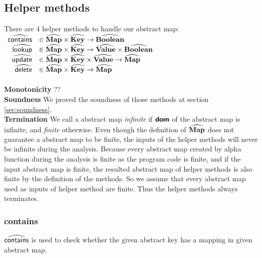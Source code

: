 \subsection{Helper methods}
There are 4 helper methods to handle our abstract map:\\

$\begin{array}{rl}
\widehat{\textsf{contains}} & \in \widehat{\textbf{Map}} \times \widehat{\textbf{Key}} \rightarrow \widehat{\textbf{Boolean}} \\
\widehat{\textsf{lookup}} & \in \widehat{\textbf{Map}} \times \widehat{\textbf{Key}} \rightarrow \widehat{\textbf{Value}} \times \widehat{\textbf{Boolean}} \\
\widehat{\textsf{update}} & \in \widehat{\textbf{Map}} \times \widehat{\textbf{Key}} \times \widehat{\textbf{Value}} \rightarrow \widehat{\textbf{Map}} \\
\widehat{\textsf{delete}} & \in \widehat{\textbf{Map}} \times \widehat{\textbf{Key}} \rightarrow \widehat{\textbf{Map}} \\
\end{array}$\\\\

\textbf{Monotonicity } ??\\

\textbf{Soundness }
We proved the soundness of those methods at section \ref{sec:soundness}.\\

\textbf{Termination }
We call a abstract map \emph{infinite} if $\textsf{\textbf{dom}}$ of the abstract map is infinite,
and \emph{finite} otherwise.
Even though the definition of $\widehat{\textbf{Map}}$ does not guarantee a abstract map to be finite,
the inputs of the helper methods will never be infinite during the analysis.
Because every abstract map created by alpha function during the analysis is finite
as the program code is finite, and if the input abstract map is finite, 
the resulted abstract map of helper methods is also finite by the definition of the methods.
So we assume that every abstract map used as inputs of helper method are finite.
Thus the helper methods always terminates.\\

\subsubsection{contains}
$\widehat{\textsf{contains}}$ is used to check whether the given abstract key
has a mapping in given abstract map.\\

